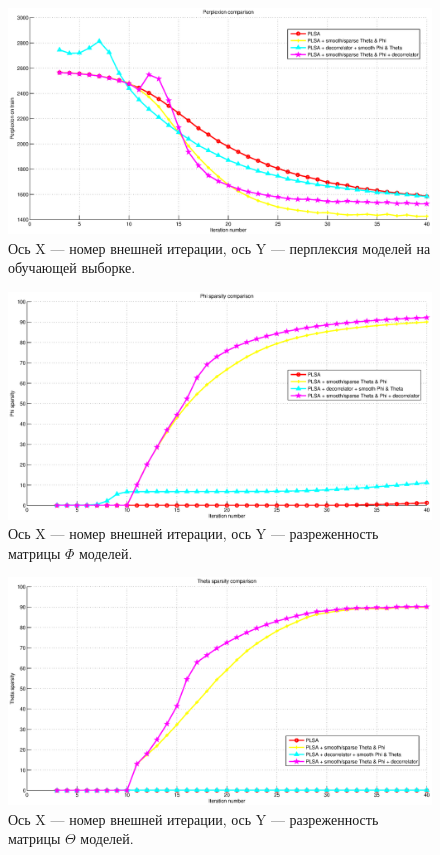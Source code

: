 \begin{figure}[h!]\center
\includegraphics[scale = 0.5]{perplex.eps}
\caption{Ось X --- номер внешней итерации, ось Y --- перплексия моделей на обучающей выборке.}
\end{figure}

\begin{figure}[h!]\center
\includegraphics[scale = 0.5]{phi_sp.eps}
\caption{Ось X --- номер внешней итерации, ось Y --- разреженность матрицы $\Phi$ моделей.}
\end{figure}

\begin{figure}[h!]\center
\includegraphics[scale = 0.5]{theta_sp.eps}
\caption{Ось X --- номер внешней итерации, ось Y --- разреженность матрицы $\Theta$ моделей.}
\end{figure}


